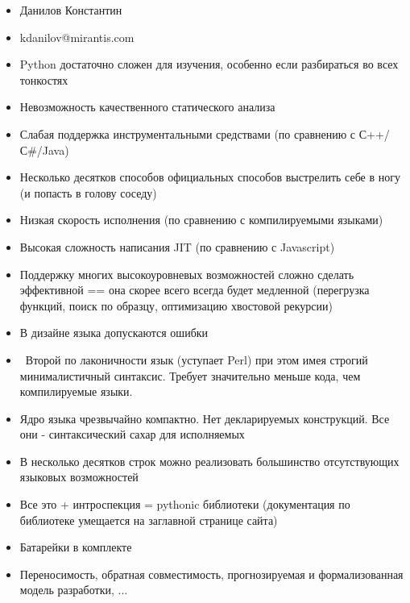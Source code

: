 \documentclass{article}
\begin{document}
\LARGE

\begin{itemize}
    \item Данилов Константин
    \item kdanilov@mirantis.com
\end{itemize}
\newpage
\begin{itemize}
    \item Python достаточно сложен для изучения, особенно если разбираться во всех тонкостях
    \item Невозможность качественного статического анализа
    \item Слабая поддержка инструментальными средствами (по сравнению с С++/С\#/Java)
    \item Несколько десятков способов официальных способов выстрелить себе в ногу (и попасть в голову соседу)
    \item Низкая скорость исполнения (по сравнению с компилируемыми языками)
    \item Высокая сложность написания JIT (по сравнению с Javascript)
    \item Поддержку многих высокоуровневых возможностей сложно сделать эффективной 
          == она скорее всего всегда будет медленной
            (перегрузка функций, поиск по образцу, оптимизацию хвостовой рекурсии)
    \item В дизайне языка допускаются ошибки
\end{itemize}
\newpage

\begin{itemize}
    \item ~Второй по лаконичности язык (уступает Perl) при этом имея строгий 
            минималистичный синтаксис. Требует значительно меньше кода, чем компилируемые языки.
    \item Ядро языка чрезвычайно компактно. Нет декларируемых конструкций. 
            Все они - синтаксический сахар для исполняемых
    \item В несколько десятков строк можно реализовать большинство отсутствующих языковых возможностей 
    \item Все это + интроспекция = pythonic библиотеки 
        (документация по библиотеке умещается на заглавной странице сайта)
    \item Батарейки в комплекте
    \item Переносимость, обратная совместимость, прогнозируемая и формализованная модель разработки, ...
\end{itemize}
\newpage
\end{document}
